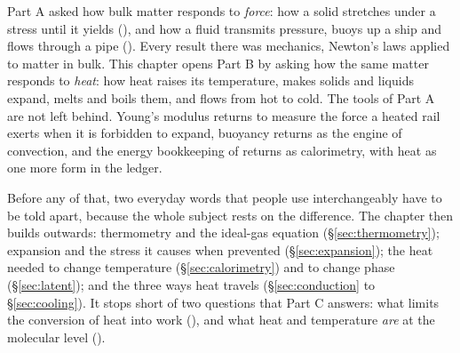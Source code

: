
Part A asked how bulk matter responds to \emph{force}: how a solid stretches under a stress until it
yields (), and how a fluid transmits pressure, buoys up a ship and flows through a pipe
(). Every result there was mechanics, Newton's laws applied to matter in bulk. This
chapter opens Part B by asking how the same matter responds to \emph{heat}: how heat raises its
temperature, makes solids and liquids expand, melts and boils them, and flows from hot to cold. The
tools of Part A are not left behind. Young's modulus returns to measure the force a heated rail exerts
when it is forbidden to expand, buoyancy returns as the engine of convection, and the energy
bookkeeping of  returns as calorimetry, with heat as one more form in the ledger.

Before any of that, two everyday words that people use interchangeably have to be told apart, because
the whole subject rests on the difference. The chapter then builds outwards: thermometry and the
ideal-gas equation (\S\ref{sec:thermometry}); expansion and the stress it causes when prevented
(\S\ref{sec:expansion}); the heat needed to change temperature (\S\ref{sec:calorimetry}) and to change
phase (\S\ref{sec:latent}); and the three ways heat travels (\S\ref{sec:conduction} to
\S\ref{sec:cooling}). It stops short of two questions that Part C answers: what limits the conversion of
heat into work (), and what heat and temperature \emph{are} at the molecular level
().

